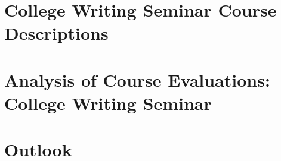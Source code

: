 \documentclass[../../main.tex]{subfiles}
\begin{document}
\section{College Writing Seminar Course Descriptions}
\label{sec:writing}

%

\begin{flushleft}

\end{flushleft}

\section{Analysis of Course Evaluations: College Writing Seminar}
\label{sec:writing_eval}

%

\begin{flushleft}

\end{flushleft}

\section{Outlook}
\label{sec:outlook}

%

\begin{flushleft}

\end{flushleft}
\end{document}
